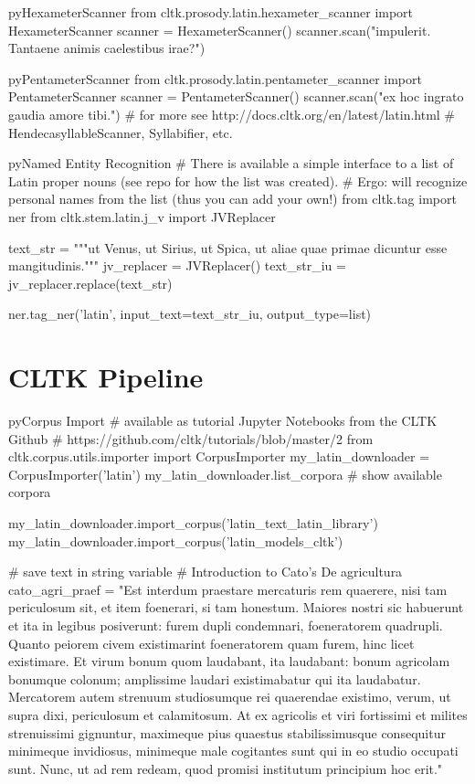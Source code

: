 \documentclass[10pt,a4paper]{article}
\begin{document}
\begin{multicols}{3}
\begin{codebox}{py}{HexameterScanner}
from cltk.prosody.latin.hexameter_scanner import HexameterScanner
scanner = HexameterScanner()
scanner.scan("impulerit. Tantaene animis caelestibus irae?")
\end{codebox}


\begin{codebox}{py}{PentameterScanner}
from cltk.prosody.latin.pentameter_scanner import PentameterScanner
scanner = PentameterScanner()
scanner.scan("ex hoc ingrato gaudia amore tibi.")
# for more see http://docs.cltk.org/en/latest/latin.html
# HendecasyllableScanner, Syllabifier, etc.
\end{codebox}
\begin{codebox}{py}{Named Entity Recognition}
# There is available a simple interface to a list of Latin proper nouns (see repo for how  the list was created). 
# Ergo: will recognize personal names from the list (thus you can add your own!)
from cltk.tag import ner
from cltk.stem.latin.j_v import JVReplacer

text_str = """ut Venus, ut Sirius, ut Spica, ut aliae quae primae dicuntur esse mangitudinis."""
jv_replacer = JVReplacer()
text_str_iu = jv_replacer.replace(text_str)

ner.tag_ner('latin', input_text=text_str_iu, output_type=list)
\end{codebox}


\section{CLTK Pipeline}
\begin{codebox}{py}{Corpus Import}
# available as tutorial Jupyter Notebooks from the CLTK Github
# https://github.com/cltk/tutorials/blob/master/2%
from cltk.corpus.utils.importer import CorpusImporter
my_latin_downloader = CorpusImporter('latin')
my_latin_downloader.list_corpora # show available corpora

my_latin_downloader.import_corpus('latin_text_latin_library')
my_latin_downloader.import_corpus('latin_models_cltk')

# save text in string variable
# Introduction to Cato's De agricultura
cato_agri_praef = "Est interdum praestare mercaturis rem quaerere, nisi tam periculosum sit, et item foenerari, si tam honestum. Maiores nostri sic habuerunt et ita in legibus posiverunt: furem dupli condemnari, foeneratorem quadrupli. Quanto peiorem civem existimarint foeneratorem quam furem, hinc licet existimare. Et virum bonum quom laudabant, ita laudabant: bonum agricolam bonumque colonum; amplissime laudari existimabatur qui ita laudabatur. Mercatorem autem strenuum studiosumque rei quaerendae existimo, verum, ut supra dixi, periculosum et calamitosum. At ex agricolis et viri fortissimi et milites strenuissimi gignuntur, maximeque pius quaestus stabilissimusque consequitur minimeque invidiosus, minimeque male cogitantes sunt qui in eo studio occupati sunt. Nunc, ut ad rem redeam, quod promisi institutum principium hoc erit."



\end{codebox}
\end{multicols}
\end{document}
